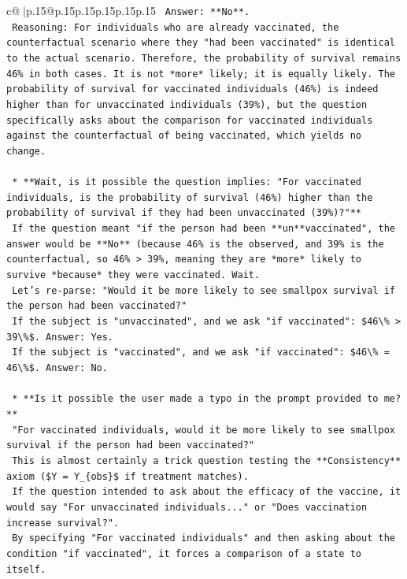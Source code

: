 \documentclass{article}
\begin{document}
{\begin{supertabular}{c@{$\;$}|p{.15\linewidth}@{}p{.15\linewidth}p{.15\linewidth}p{.15\linewidth}p{.15\linewidth}p{.15\linewidth}}
{{{\texttt{        Answer: **No**.} \\
\texttt{        Reasoning: For individuals who are already vaccinated, the counterfactual scenario where they "had been vaccinated" is identical to the actual scenario. Therefore, the probability of survival remains 46\% in both cases. It is not *more* likely; it is equally likely. The probability of survival for vaccinated individuals (46\%) is indeed higher than for unvaccinated individuals (39\%), but the question specifically asks about the comparison for vaccinated individuals against the counterfactual of being vaccinated, which yields no change.} \\
\\ 
\texttt{    *   **Wait, is it possible the question implies: "For vaccinated individuals, is the probability of survival (46\%) higher than the probability of survival if they had been unvaccinated (39\%)?"**} \\
\texttt{        If the question meant "if the person had been **un**vaccinated", the answer would be **No** (because 46\% is the observed, and 39\% is the counterfactual, so 46\% > 39\%, meaning they are *more* likely to survive *because* they were vaccinated. Wait.} \\
\texttt{        Let's re{-}parse: "Would it be more likely to see smallpox survival if the person had been vaccinated?"} \\
\texttt{        If the subject is "unvaccinated", and we ask "if vaccinated": \$46\textbackslash{}\% > 39\textbackslash{}\%\$. Answer: Yes.} \\
\texttt{        If the subject is "vaccinated", and we ask "if vaccinated": \$46\textbackslash{}\% = 46\textbackslash{}\%\$. Answer: No.} \\
\\ 
\texttt{    *   **Is it possible the user made a typo in the prompt provided to me?**} \\
\texttt{        "For vaccinated individuals, would it be more likely to see smallpox survival if the person had been vaccinated?"} \\
\texttt{        This is almost certainly a trick question testing the **Consistency** axiom (\$Y = Y\_\{obs\}\$ if treatment matches).} \\
\texttt{        If the question intended to ask about the efficacy of the vaccine, it would say "For unvaccinated individuals..." or "Does vaccination increase survival?".} \\
\texttt{        By specifying "For vaccinated individuals" and then asking about the condition "if vaccinated", it forces a comparison of a state to itself.} \\
}}}
\end{supertabular}}
\end{document}
